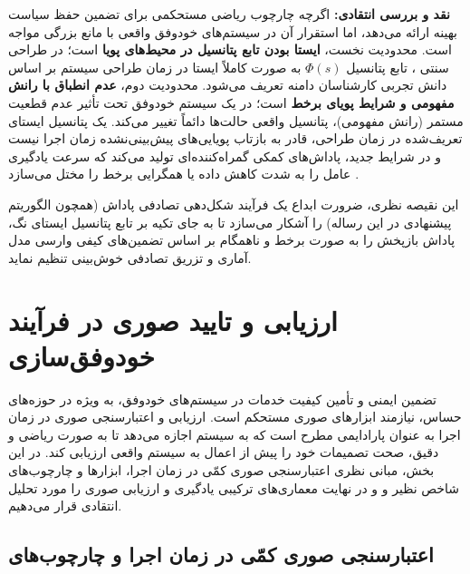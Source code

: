 \documentclass[oneside,openany,phd]{TMU-Thesis}
\begin{document}
\textbf{نقد و بررسی انتقادی:}
اگرچه  چارچوب ریاضی مستحکمی برای تضمین حفظ سیاست بهینه ارائه می‌دهد، اما استقرار آن در سیستم‌های خودوفق واقعی با مانع بزرگی مواجه است.
محدودیت نخست، \textbf{ایستا بودن تابع پتانسیل در محیط‌های پویا} است؛ در طراحی سنتی  \cite{ng1999policy}، تابع پتانسیل $\Phi(s)$ به صورت کاملاً ایستا در زمان طراحی سیستم بر اساس دانش تجربی کارشناسان دامنه تعریف می‌شود.
محدودیت دوم، \textbf{عدم انطباق با رانش مفهومی و شرایط پویای برخط} است؛ در یک سیستم خودوفق تحت تأثیر عدم قطعیت مستمر (رانش مفهومی)، پتانسیل واقعی حالت‌ها دائماً تغییر می‌کند. یک پتانسیل ایستای تعریف‌شده در زمان طراحی، قادر به بازتاب پویایی‌های پیش‌بینی‌نشده زمان اجرا نیست و در شرایط جدید، پاداش‌های کمکی گمراه‌کننده‌ای تولید می‌کند که سرعت یادگیری عامل را به شدت کاهش داده یا همگرایی برخط را مختل می‌سازد \cite{gheibi2024dealing}.

این نقیصه نظری، ضرورت ابداع یک فرآیند شکل‌دهی تصادفی پاداش (همچون الگوریتم پیشنهادی  در این رساله) را آشکار می‌سازد تا به جای تکیه بر تابع پتانسیل ایستای نگ، پاداش بازپخش را به صورت برخط و ناهمگام بر اساس تضمین‌های کیفی وارسی مدل آماری  و تزریق تصادفی خوش‌بینی تنظیم نماید.

\section{ارزیابی و تایید صوری در فرآیند خودوفق‌سازی}
\label{sec:ch3_formal_verification}

تضمین ایمنی و تأمین کیفیت خدمات در سیستم‌های خودوفق، به ویژه در حوزه‌های حساس، نیازمند ابزارهای صوری مستحکم است. ارزیابی و اعتبارسنجی صوری در زمان اجرا به عنوان پارادایمی مطرح است که به سیستم اجازه می‌دهد تا به صورت ریاضی و دقیق، صحت تصمیمات خود را پیش از اعمال به سیستم واقعی ارزیابی کند. در این بخش، مبانی نظری اعتبارسنجی صوری کمّی در زمان اجرا، ابزارها و چارچوب‌های شاخص نظیر  و  و در نهایت معماری‌های ترکیبی یادگیری و ارزیابی صوری را مورد تحلیل انتقادی قرار می‌دهیم.

\subsection{اعتبارسنجی صوری کمّی در زمان اجرا و چارچوب‌های }
\label{sec:ch3_qvr}
\label{sec:ch3_activforms_uppaal}
\end{document}
